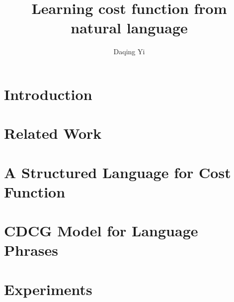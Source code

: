 \documentclass[10pt,a4paper]{article}
\begin{document}
\title{Learning cost function from natural language}	
\author{Daqing Yi}
\date{}
\maketitle

\section{Introduction}

\section{Related Work}

\section{A Structured Language for Cost Function}


\section{CDCG Model for Language Phrases}



\section{Experiments}
 	
	
\end{document}
